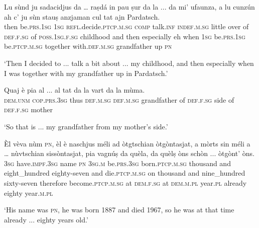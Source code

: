 \begin{linenumbers}
\gll Lu sùnd ju sadacidjus da … raṣdá in pau ṣur da la ... da mi’ ufaunza, a lu cunzún ah c’ ju sùn stauṣ anzjaman cul tat ajn Pardatsch.\\
then be.\textsc{prs.1sg}  \textsc{1sg}  \textsc{refl}.decide.\textsc{ptcp.m.sg}  \textsc{comp} {} talk.\textsc{inf} \textsc{indef.m.sg} little over of  \textsc{def.f.sg} {} of  \textsc{poss.1sg.f.sg} childhood and then especially eh when \textsc{1sg}  be.\textsc{prs.1sg}  be.\textsc{ptcp.m.sg} together with.\textsc{def.m.sg} grandfather up \textsc{pn}\\
\end{linenumbers}
\medskip
\glt `Then I decided to ... talk a bit about ... my childhood, and then especially when I was together with my grandfather up in Pardatsch.'
\medskip

\begin{linenumbers}
\gll  Quaj è pia al ... al tat da la vart da la mùma. \\
    \textsc{dem.unm} \textsc{cop.prs.3sg} thus \textsc{def.m.sg} {} \textsc{def.m.sg} grandfather of \textsc{def.f.sg} side of \textsc{def.f.sg} mother\\
\end{linenumbers}
\medskip
\glt `So that is ... my grandfather from my mother’s side.'
\medskip

\begin{linenumbers}
\gll  Èl vèva nùm \textsc{pn}, èl è naschjus méli ad òtgtschian òtgòntasjat, a mòrts sin méli a … nùvtschian sissòntasjat, pia vagnúṣ da quèla, da quèlṣ òns schòn ... òtgònt’ òns.  \\
     \textsc{3sg} have.\textsc{impf.3sg} name \textsc{pn}  \textsc{3sg.m} be.\textsc{prs.3sg} born.\textsc{ptcp.m.sg} thousand and eight\_hundred eighty-seven and die.\textsc{ptcp.m.sg} on thousand and {} nine\_hundred sixty-seven therefore become.\textsc{ptcp.m.sg} at \textsc{dem.f.sg} at \textsc{dem.m.pl} year.\textsc{pl} already {} eighty year.\textsc{m.pl} \\
\end{linenumbers}
\medskip
\glt `His name was \textsc{pn}, he was born 1887 and died 1967, so he was at that time already ... eighty years old.'
\medskip

